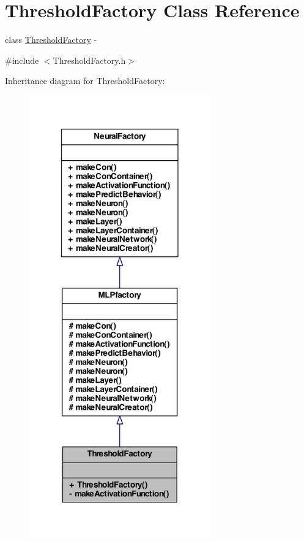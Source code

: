 \hypertarget{class_threshold_factory}{
\section{ThresholdFactory Class Reference}
\label{class_threshold_factory}
}


class \hyperlink{class_threshold_factory}{ThresholdFactory} -\/  




{\ttfamily \#include $<$ThresholdFactory.h$>$}



Inheritance diagram for ThresholdFactory:\nopagebreak
\begin{figure}[H]
\begin{center}
\leavevmode
\includegraphics[width=222pt]{class_threshold_factory__inherit__graph}
\end{center}
\end{figure}


